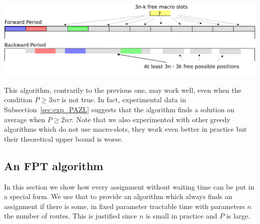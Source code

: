 \documentclass[a4paper,10pt]{article}
\begin{document}
      \begin{center}
      \includegraphics[width=\textwidth]{ex3nt.png}
      \end{center}
% 
% 
% 
	
This algorithm, contrarily to the previous one, may work well, even when the condition $P \geq 3n\tau$ is not true.
In fact, experimental data in Subsection~\ref{sec:exp_PAZL} suggests that the algorithm finds a solution on average when $P \geq 2 n\tau$.
Note that we also experimented with other greedy algorithms which do not use macro-slots, they work even better in practice but their theoretical upper bound is worse.

\subsection*{An FPT algorithm}

In this section we show how every assignment without waiting time can be put in a special form.
We use that to provide an algorithm which always finds an assignment if there is some, in fixed parameter 
tractable time with parameters $n$ the number of routes. This is justified since $n$ is small in practice and $P$ is large.
\end{document}
